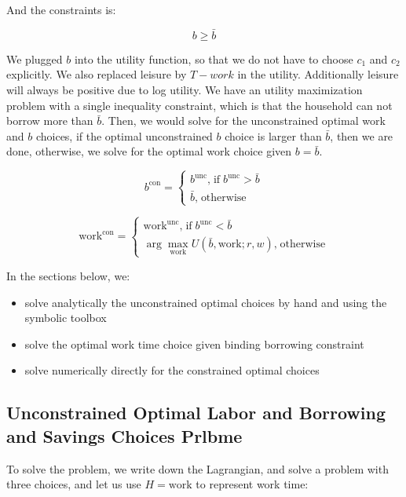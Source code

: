 \documentclass[
]{book}
\begin{document}
And the constraints is:

\[b\ge \bar{b}\]

We plugged \(b\) into the utility function, so that we do not have to
choose \(c_1\) and \(c_2\) explicitly. We also replaced leisure by \(T-work\)
in the utility. Additionally leisure will always be positive due to log
utility. We have an utility maximization problem with a single
inequality constraint, which is that the household can not borrow more
than \(\bar{b}\). Then, we would solve for the unconstrained optimal work
and \(b\) choices, if the optimal unconstrained \(b\) choice is larger than
\(\bar{b}\), then we are done, otherwise, we solve for the optimal work
choice given \(b=\bar{b}\).

\[b^{\textrm{con}} =\left\lbrace \begin{array}{c}
b^{\textrm{unc}} \textrm{,}\;\textrm{if}\;b^{\textrm{unc}} >\bar{b} \\
\bar{b} \textrm{,}\;\textrm{otherwise}
\end{array}\right.\]

\[{\textrm{work}}^{\textrm{con}} =\left\lbrace \begin{array}{c}
{\textrm{work}}^{\textrm{unc}} \textrm{,}\;\textrm{if}\;b^{\textrm{unc}} <\bar{b} \\
\arg \max_{\textrm{work}} U\left(\bar{b} ,\textrm{work};r,w\right)\textrm{,}\;\textrm{otherwise}
\end{array}\right.\]

In the sections below, we:

\begin{itemize}
\item
  solve analytically the unconstrained optimal choices by hand and
  using the symbolic toolbox
\item
  solve the optimal work time choice given binding borrowing
  constraint
\item
  solve numerically directly for the constrained optimal choices
\end{itemize}

\hypertarget{unconstrained-optimal-labor-and-borrowing-and-savings-choices-prlbme}{%
\subsection{Unconstrained Optimal Labor and Borrowing and Savings Choices Prlbme}\label{unconstrained-optimal-labor-and-borrowing-and-savings-choices-prlbme}}

To solve the problem, we write down the Lagrangian, and solve a problem
with three choices, and let us use \(H=\textrm{work}\) to represent work
time:
\end{document}
